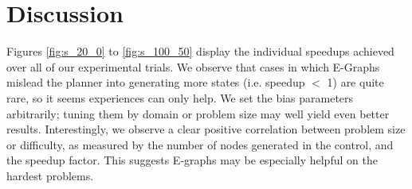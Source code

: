 \documentclass[letterpaper]{article}
\begin{document}
\begin{table}
	\centering
	\caption{Experiment 2 speedup statistics, summarized in the form (1st quartile)-(3rd quartile).}
	 \label{tab:walk}
\end{table}

\section{Discussion}

Figures \ref{fig:s_20_0} to \ref{fig:s_100_50} display the individual speedups achieved over all of our experimental trials. We observe that cases in which E-Graphs mislead the planner into generating more states (i.e. speedup $<$ 1) are quite rare, so it seems experiences can only help. We set the bias parameters arbitrarily; tuning them by domain or problem size may well yield even better results. Interestingly, we observe a clear positive correlation between problem size or difficulty, as measured by the number of nodes generated in the control, and the speedup factor. This suggests E-graphs may be especially helpful on the hardest problems.
\end{document}
